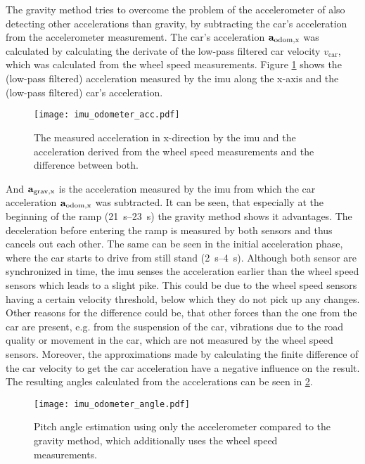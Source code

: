 The gravity method tries to overcome the problem of the accelerometer of also detecting other accelerations than gravity, by subtracting the car's acceleration from the accelerometer measurement.
The car's acceleration $\vb{a}_\mathrm{odom,x} $ was calculated by calculating the derivate of the low-pass filtered car velocity $v_\mathrm{car} $, which was calculated from the wheel speed measurements.
Figure \ref{fig:imu_odometer_acc} shows the (low-pass filtered) acceleration measured by the \gls{imu} along the x-axis and the (low-pass filtered) car's acceleration.
\begin{figure}[htb]
	\centering
	\texttt{[image: imu\_odometer\_acc.pdf]}
	\caption[Acceleration from  and odometer]{The measured acceleration in x-direction by the \gls{imu} and the acceleration derived from the wheel speed measurements and the difference between both.}
	\label{fig:imu_odometer_acc}
\end{figure}
And $\vb{a}_\mathrm{grav,x} $ is the acceleration measured by the \gls{imu} from which the car acceleration $\vb{a}_\mathrm{odom,x} $ was subtracted.
It can be seen, that especially at the beginning of the ramp (\SIrange{21}{23}{\second}) the gravity method shows it advantages.
The deceleration before entering the ramp is measured by both sensors and thus cancels out each other.
The same can be seen in the initial acceleration phase, where the car starts to drive from still stand (\SIrange[]{2}{4}{\second}).
Although both sensor are synchronized in time, the \gls{imu} senses the acceleration earlier than the wheel speed sensors which leads to a slight pike.
This could be due to the wheel speed sensors having a certain velocity threshold, below which they do not pick up any changes.
Other reasons for the difference could be, that other forces than the one from the car are present, e.g. from the suspension of the car, vibrations due to the road quality or movement in the car, which are not measured by the wheel speed sensors.
Moreover, the approximations made by calculating the finite difference of the car velocity to get the car acceleration have a negative influence on the result.\\
The resulting angles calculated from the accelerations can be seen in \cref{fig:imu_odometer_angle}.
\begin{figure}[htb]
	\centering
	\texttt{[image: imu\_odometer\_angle.pdf]}
	\caption[Angle estimation using the gravity method]{Pitch angle estimation using only the accelerometer compared to the gravity method, which additionally uses the wheel speed measurements.}
	\label{fig:imu_odometer_angle}
\end{figure}
